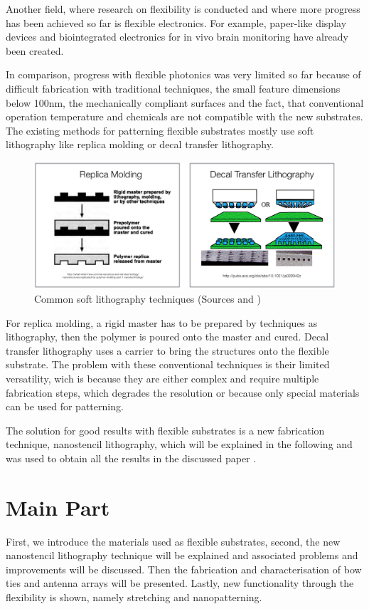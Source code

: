 \documentclass[journal, a4paper]{IEEEtran}
\begin{document}
	Another field, where research on flexibility is conducted and where more progress has been achieved so far is flexible electronics. For example, paper-like display devices and biointegrated electronics for in vivo brain monitoring have already been created. 
	
	In comparison, progress with flexible photonics was very limited so far because of difficult fabrication with traditional techniques, the small feature dimensions below 100nm, the mechanically compliant surfaces and the fact, that conventional operation temperature and chemicals are not compatible with the new substrates. The existing methods for patterning flexible substrates mostly use soft lithography like replica molding or decal transfer lithography.

\begin{figure}[hbt!]
\begin{center}
\includegraphics[width=\columnwidth]{02softlitho.png}
\caption{Common soft lithography techniques (Sources \cite{replica} and \cite{decal})}
\label{fig:soft-litho}
\end{center}
\end{figure}	

For replica molding, a rigid master has to be prepared by techniques as lithography, then the polymer is poured onto the master and cured. Decal transfer lithography uses a carrier to bring the structures onto the flexible substrate. The problem with these conventional techniques is their limited versatility, wich is because they are either complex and require multiple fabrication steps, which degrades the resolution or because only special materials can be used for patterning. 

The solution for good results with flexible substrates is a new fabrication technique, nanostencil lithography, which will be explained in the following and was used to obtain all the results in the discussed paper \cite{paper}.


\section{Main Part}
First, we introduce the materials used as flexible substrates, second, the new nanostencil lithography technique will be explained and associated problems and improvements will be discussed. Then the fabrication and characterisation of bow ties and antenna arrays will be presented. Lastly, new functionality through the flexibility is shown, namely stretching and nanopatterning. 
\end{document}
